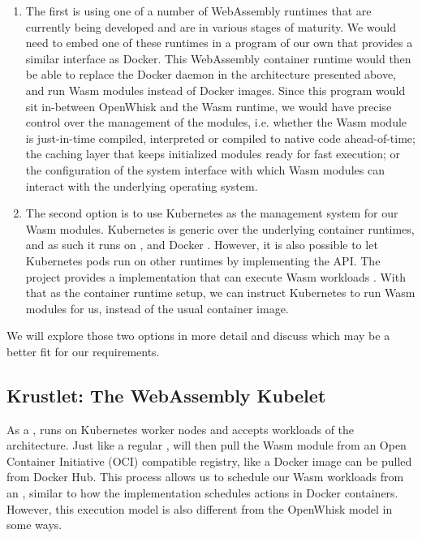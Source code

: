 \begin{enumerate}
    \item The first is using one of a number of WebAssembly runtimes that are currently being developed and are in various stages of maturity. We would need to embed one of these runtimes in a program of our own that provides a similar interface as Docker. This WebAssembly container runtime would then be able to replace the Docker daemon in the architecture presented above, and run Wasm modules instead of Docker images. Since this program would sit in-between OpenWhisk and the Wasm runtime, we would have precise control over the management of the modules, i.e. whether the Wasm module is just-in-time compiled, interpreted or compiled to native code ahead-of-time; the caching layer that keeps initialized modules ready for fast execution; or the configuration of the system interface with which Wasm modules can interact with the underlying operating system.
    \item The second option is to use Kubernetes as the management system for our Wasm modules. Kubernetes is generic over the underlying container runtimes, and as such it runs on ,  and Docker \cite{Kub2021}. However, it is also possible to let Kubernetes pods run on other runtimes by implementing the  API. The  project provides a  implementation that can execute Wasm workloads \cite{Krustlet2021}. With that as the container runtime setup, we can instruct Kubernetes to run Wasm modules for us, instead of the usual container image.
\end{enumerate}

We will explore those two options in more detail and discuss which may be a better fit for our requirements.

\subsection{Krustlet: The WebAssembly Kubelet}

As a ,  runs on Kubernetes worker nodes and accepts workloads of the  architecture. Just like a regular ,  will then pull the Wasm module from an Open Container Initiative (OCI) compatible registry, like a Docker image can be pulled from Docker Hub. This process allows us to schedule our Wasm workloads from an , similar to how the  implementation schedules actions in Docker containers. However, this execution model is also different from the OpenWhisk model in some ways.


